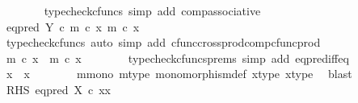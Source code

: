 \begin{isabellebody}
\ \ \ \ \ \ \isamarkupfalse%
\ {\isacharparenleft}{\kern0pt}typecheck{\isacharunderscore}{\kern0pt}cfuncs{\isacharcomma}{\kern0pt}\ simp\ add{\isacharcolon}{\kern0pt}\ comp{\isacharunderscore}{\kern0pt}associative{}{\isacharparenright}{\kern0pt}\isanewline
\ \ \ \ \isamarkupfalse%
\ \isamarkupfalse%
\ {\isachardoublequoteopen}eq{\isacharunderscore}{\kern0pt}pred\ Y\ {\isasymcirc}\isactrlsub c\ {\isasymlangle}m\ {\isasymcirc}\isactrlsub c\ x{}{\isacharcomma}{\kern0pt}\ m\ {\isasymcirc}\isactrlsub c\ x{}{\isasymrangle}\ {\isacharequal}{\kern0pt}\ {\isasymt}{\isachardoublequoteclose}\isanewline
\ \ \ \ \ \ \isamarkupfalse%
\ {\isacharparenleft}{\kern0pt}typecheck{\isacharunderscore}{\kern0pt}cfuncs{\isacharcomma}{\kern0pt}\ auto\ simp\ add{\isacharcolon}{\kern0pt}\ cfunc{\isacharunderscore}{\kern0pt}cross{\isacharunderscore}{\kern0pt}prod{\isacharunderscore}{\kern0pt}comp{\isacharunderscore}{\kern0pt}cfunc{\isacharunderscore}{\kern0pt}prod{\isacharparenright}{\kern0pt}\isanewline
\ \ \ \ \isamarkupfalse%
\ \isamarkupfalse%
\ {\isachardoublequoteopen}m\ {\isasymcirc}\isactrlsub c\ x{}\ {\isacharequal}{\kern0pt}\ m\ {\isasymcirc}\isactrlsub c\ x{}{\isachardoublequoteclose}\isanewline
\ \ \ \ \ \ \isamarkupfalse%
\ {\isacharparenleft}{\kern0pt}typecheck{\isacharunderscore}{\kern0pt}cfuncs{\isacharunderscore}{\kern0pt}prems{\isacharcomma}{\kern0pt}\ simp\ add{\isacharcolon}{\kern0pt}\ eq{\isacharunderscore}{\kern0pt}pred{\isacharunderscore}{\kern0pt}iff{\isacharunderscore}{\kern0pt}eq{\isacharparenright}{\kern0pt}\isanewline
\ \ \ \ \isamarkupfalse%
\ \isamarkupfalse%
\ {\isachardoublequoteopen}x{}\ {\isacharequal}{\kern0pt}\ x{}{\isachardoublequoteclose}\isanewline
\ \ \ \ \ \ \isamarkupfalse%
\ m{\isacharunderscore}{\kern0pt}mono\ m{\isacharunderscore}{\kern0pt}type\ monomorphism{\isacharunderscore}{\kern0pt}def{}\ x{}{\isacharunderscore}{\kern0pt}type\ x{}{\isacharunderscore}{\kern0pt}type\ \isamarkupfalse%
\ blast\isanewline
\ \ \ \ \isamarkupfalse%
\ \isamarkupfalse%
\ RHS{\isacharcolon}{\kern0pt}\ {\isachardoublequoteopen}eq{\isacharunderscore}{\kern0pt}pred\ X\ {\isasymcirc}\isactrlsub c\ {\isasymlangle}x{}{\isacharcomma}{\kern0pt}x{}{\isasymrangle}\ {\isacharequal}{\kern0pt}\ {\isasymt}{\isachardoublequoteclose}\isanewline

\end{isabellebody}
